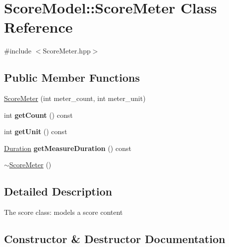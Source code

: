 \hypertarget{classScoreModel_1_1ScoreMeter}{}\section{Score\+Model\+::Score\+Meter Class Reference}
\label{classScoreModel_1_1ScoreMeter}


{\ttfamily \#include $<$Score\+Meter.\+hpp$>$}

\subsection*{Public Member Functions}
\begin{DoxyCompactItemize}
\item 
\mbox{\hyperlink{classScoreModel_1_1ScoreMeter_ae692ed209bec161d49c7cb8ee20c2cea}{Score\+Meter}} (int meter\+\_\+count, int meter\+\_\+unit)
\item 
\mbox{\label{classScoreModel_1_1ScoreMeter_a4e66cf499c93208b94ccec7d5db36dbd}} 
int {\bfseries get\+Count} () const
\item 
\mbox{\label{classScoreModel_1_1ScoreMeter_a124f6dd20bf1ec95035202c852b32fa5}} 
int {\bfseries get\+Unit} () const
\item 
\mbox{\label{classScoreModel_1_1ScoreMeter_a9c1860b9f26b0fd42e4114559f298c35}} 
\mbox{\hyperlink{classScoreModel_1_1Duration}{Duration}} {\bfseries get\+Measure\+Duration} () const
\item 
\mbox{\hyperlink{classScoreModel_1_1ScoreMeter_a9ed75a55cff4e108711488da45ea8f97}{$\sim$\+Score\+Meter}} ()
\end{DoxyCompactItemize}


\subsection{Detailed Description}
The score class\+: models a score content 

\subsection{Constructor \& Destructor Documentation}
\mbox{\label{classScoreModel_1_1ScoreMeter_ae692ed209bec161d49c7cb8ee20c2cea}} 
